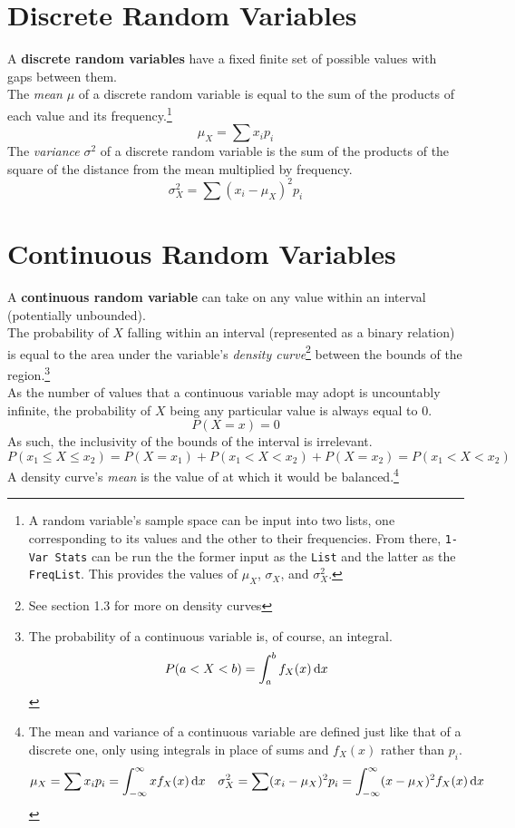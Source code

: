 \documentclass[../AP_Statistics.tex]{subfiles}
\begin{document}
		\section{Discrete Random Variables}
			A \textbf{discrete random variables} have a fixed finite set of possible values with gaps between them. \\
			The \emph{mean} $\mu$ of a discrete random variable is equal to the sum of the products of each value and its frequency.\footnote{A random variable's sample space can be input into two lists, one corresponding to its values and the other to their frequencies. From there, \texttt{1-Var Stats} can be run the the former input as the \texttt{List} and the latter as the \texttt{FreqList}. This provides the values of $\mu_X$, $\sigma_X$, and $\sigma_X^2$.}
			\[\mu_X = \sum x_ip_i\]
			The \emph{variance} $\sigma^2$ of a discrete random variable is the sum of the products of the square of the distance from the mean multiplied by frequency.
			\[\sigma_X^2 = \sum(x_i - \mu_X)^2p_i\]
		\section{Continuous Random Variables}
			A \textbf{continuous random variable} can take on any value within an interval (potentially unbounded). \\
			The probability of $X$ falling within an interval (represented as a binary relation) is equal to the area under the variable's \emph{density curve}\footnote{See section 1.3 for more on density curves} between the bounds of the region.\footnote{The probability of a continuous variable is, of course, an integral.\[P(a < X < b) = \int_a^bf_X(x)\,\mathrm{d} x\]} \\
			As the number of values that a continuous variable may adopt is uncountably infinite, the probability of $X$ being any particular value is always equal to 0.
			\[P(X = x) = 0\]
			As such, the inclusivity of the bounds of the interval is irrelevant.
			\[P(x_1 \le X \le x_2) = P(X = x_1) + P(x_1 < X < x_2) + P(X = x_2) = P(x_1 < X < x_2)\]
			A density curve's \emph{mean} is the value of at which it would be balanced.\footnote{The mean and variance of a continuous variable are defined just like that of a discrete one, only using integrals in place of sums and $f_X(x)$ rather than $p_i$.\begin{align*}\mu_X = \sum x_ip_i = \int_{-\infty}^\infty xf_X(x)\,\mathrm{d} x && \sigma_X^2 = \sum(x_i - \mu_X)^2p_i = \int_{-\infty}^\infty (x - \mu_X)^2f_X(x)\,\mathrm{d} x \end{align*}} \\
\end{document}
